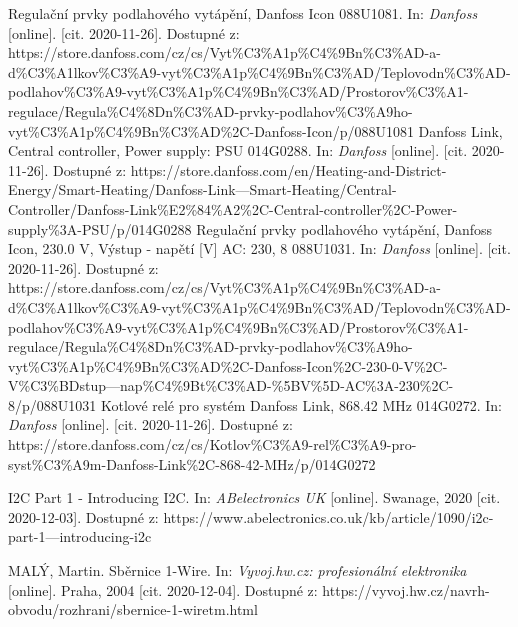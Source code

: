 \begin{thebibliography}{3}
Regulační prvky podlahového vytápění, Danfoss Icon 088U1081. In: \textit{Danfoss} [online]. [cit. 2020-11-26]. Dostupné z: https://store.danfoss.com/cz/cs/Vyt\%C3\%A1p\%C4\%9Bn\%C3\%AD-a-d\%C3\%A1lkov\%C3\%A9-vyt\%C3\%A1p\%C4\%9Bn\%C3\%AD/Teplovodn\%C3\%AD-podlahov\%C3\%A9-vyt\%C3\%A1p\%C4\%9Bn\%C3\%AD/Prostorov\%C3\%A1-regulace/Regula\%C4\%8Dn\%C3\%AD-prvky-podlahov\%C3\%A9ho-vyt\%C3\%A1p\%C4\%9Bn\%C3\%AD\%2C-Danfoss-Icon/p/088U1081
Danfoss Link, Central controller, Power supply: PSU 014G0288. In: \textit{Danfoss} [online]. [cit. 2020-11-26]. Dostupné z: https://store.danfoss.com/en/Heating-and-District-Energy/Smart-Heating/Danfoss-Link---Smart-Heating/Central-Controller/Danfoss-Link\%E2\%84\%A2\%2C-Central-controller\%2C-Power-supply\%3A-PSU/p/014G0288
Regulační prvky podlahového vytápění, Danfoss Icon, 230.0 V, Výstup - napětí [V] AC: 230, 8 088U1031. In: \textit{Danfoss} [online]. [cit. 2020-11-26]. Dostupné z: https://store.danfoss.com/cz/cs/Vyt\%C3\%A1p\%C4\%9Bn\%C3\%AD-a-d\%C3\%A1lkov\%C3\%A9-vyt\%C3\%A1p\%C4\%9Bn\%C3\%AD/Teplovodn\%C3\%AD-podlahov\%C3\%A9-vyt\%C3\%A1p\%C4\%9Bn\%C3\%AD/Prostorov\%C3\%A1-regulace/Regula\%C4\%8Dn\%C3\%AD-prvky-podlahov\%C3\%A9ho-vyt\%C3\%A1p\%C4\%9Bn\%C3\%AD\%2C-Danfoss-Icon\%2C-230-0-V\%2C-V\%C3\%BDstup---nap\%C4\%9Bt\%C3\%AD-\%5BV\%5D-AC\%3A-230\%2C-8/p/088U1031
Kotlové relé pro systém Danfoss Link, 868.42 MHz 014G0272. In: \textit{Danfoss} [online]. [cit. 2020-11-26]. Dostupné z: https://store.danfoss.com/cz/cs/Kotlov\%C3\%A9-rel\%C3\%A9-pro-syst\%C3\%A9m-Danfoss-Link\%2C-868-42-MHz/p/014G0272

I2C Part 1 - Introducing I2C. In: \textit{ABelectronics UK} [online]. Swanage, 2020 [cit. 2020-12-03]. Dostupné z: https://www.abelectronics.co.uk/kb/article/1090/i2c-part-1---introducing-i2c

MALÝ, Martin. Sběrnice 1-Wire. In: \textit{Vyvoj.hw.cz: profesionální elektronika} [online]. Praha, 2004 [cit. 2020-12-04]. Dostupné z: https://vyvoj.hw.cz/navrh-obvodu/rozhrani/sbernice-1-wiretm.html






\end{thebibliography}
